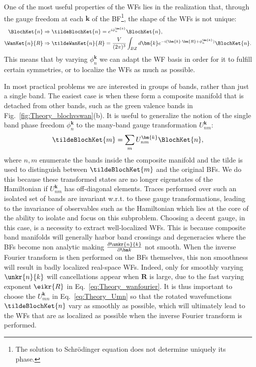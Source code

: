 One of the most useful properties of the \glspl{WF} lies in the realization that, through the gauge freedom at each $\bm{k}$ of the \gls{BF}\footnote{The solution to Schr\"odinger equation does not determine uniquely its phase.}, the shape of the \glspl{WF} is not unique:
\begin{align}
	\BlochKet{n} &\Rightarrow \tildeBlochKet{n} = e^{i \phi_n^{\bm{k}}} \BlochKet{n},\\
	\WanKet{n}{R} &\Rightarrow \tildeWanKet{n}{R} = \frac{V}{(2\pi)^3} \int_{BZ} d \bm{k} e^{-i (\bm{k} \cdot \bm{R} + \phi_n^{\bm{k}})} \BlochKet{n}.
\end{align}
This means that by varying $\phi_n^{\bm{k}}$ we can adapt the \gls{WF} basis in order for it to fulfill certain symmetries, or to localize the \glspl{WF} as much as possible.

In most practical problems we are interested in groups of bands, rather than just a single band.
The easiest case is when these form a composite manifold that is detached from other bands, such as the green valence bands in Fig.~\ref{fig:Theory_blochvswan}(b).
It is useful to generalize the notion of the single band phase freedom $\phi_n^{\bm k}$ to the many-band gauge transformation $U_{nm}^{\bm k}$:
\begin{equation}
	\label{eq:Theory_Umn}
	\tildeBlochKet{m} = \sum_m U_{nm}^{\bm{k}} \BlochKet{n},
\end{equation}
where $n,m$ enumerate the bands inside the composite manifold and the tilde is used to distinguish between $\tildeBlochKet{m}$ and the original \glspl{BF}.
We do this because these transformed states are no longer eigenstates of the Hamiltonian if $U_{nm}^{\bm{k}}$ has off-diagonal elements.
Traces performed over such an isolated set of bands are invariant w.r.t. to these gauge transformations, leading to the invariance of observables such as the Hamiltonian which lies at the core of the ability to isolate and focus on this subproblem.
Choosing a decent gauge, in this case, is a necessity to extract well-localized \glspl{WF}.
This is because composite band manifolds will generally harbor band crossings and degeneracies where the \glspl{BF} become non analytic making $\frac{\partial \unkr{n}{k}}{\partial \bm k}$ not smooth.
When the inverse Fourier transform is then performed on the \glspl{BF} themselves, this non smoothness will result in badly localized real-space \glspl{WF}.
Indeed, only for smoothly varying $\unkr{n}{k}$ will cancellations appear when $\bm{R}$ is large, due to the fast varying exponent $\eikr{R}$ in Eq.~\eqref{eq:Theory_wanfourier}.
It is thus important to choose the $U_{mn}^{\bm k}$ in Eq.~\eqref{eq:Theory_Umn} so that the rotated wavefunctions $\tildeBlochKet{n}$ vary as smoothly as possible, which will ultimately lead to the \glspl{WF} that are as localized as possible when the inverse Fourier transform is performed.

